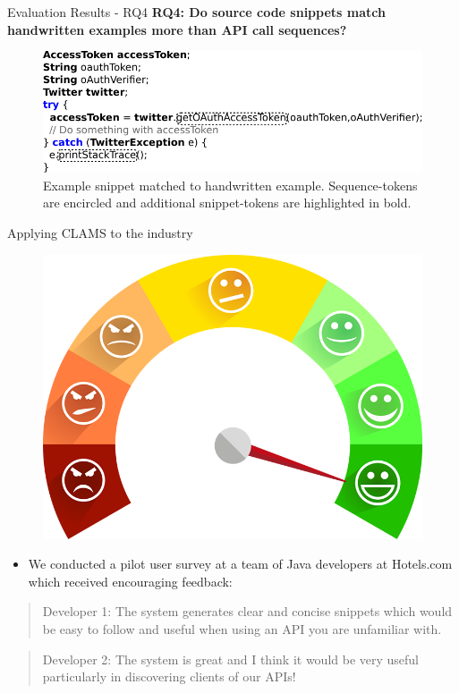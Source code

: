 \documentclass[11pt]{beamer}
\begin{document}
\begin{frame}{Evaluation Results - RQ4}
	\textbf{RQ4: Do source code snippets match handwritten examples more than API call sequences?}
	  
	\begin{figure}
		\includegraphics[scale=0.56]{MatchedExample}
		\caption{Example snippet matched to handwritten example. Sequence-tokens are encircled and additional snippet-tokens are highlighted in bold.}
	\end{figure}
\end{frame}


\begin{frame}{Applying CLAMS to the industry}
	\begin{figure}
		\includegraphics[scale=0.2]{HappyCustomers}
	\end{figure}
	\vspace{-10pt}
	\begin{itemize}
		\item {
			We conducted a pilot user survey at a team of Java developers at Hotels.com which received encouraging feedback:
		}
	\end{itemize}
	\begin{quote}
		Developer 1: The system generates clear and concise snippets which would be easy to follow and useful when using an API you are unfamiliar with.
	\end{quote}
	\begin{quote}
		Developer 2: The system is great and I think it would be very useful particularly in discovering clients of our APIs!
	\end{quote}
\end{frame}
\end{document}
